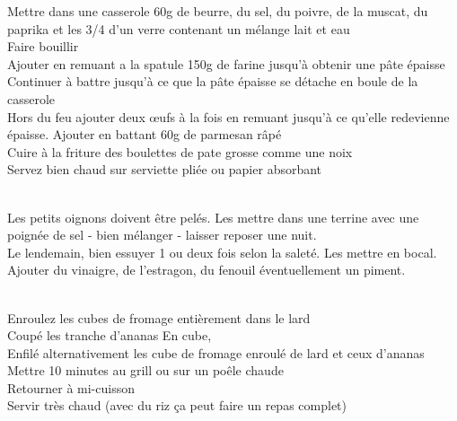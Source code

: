 \begin{minipage}[c]{\textwidth}
Mettre dans une casserole 60g de beurre, du sel, du poivre, de la muscat, du paprika et les 3/4 d'un verre contenant un mélange lait et eau\\
Faire bouillir\\
Ajouter en remuant a la spatule 150g de farine jusqu’à obtenir une pâte épaisse\\
Continuer à battre jusqu’à ce que la pâte épaisse se détache en boule de la casserole\\
Hors du feu ajouter deux œufs à la fois en remuant jusqu'à   ce qu'elle redevienne épaisse. Ajouter en battant 60g de parmesan râpé\\
Cuire à la friture des boulettes de pate grosse comme une noix\\
Servez bien chaud sur serviette pliée ou papier absorbant\\
\\

\end{minipage}

\begin{minipage}[c]{\textwidth}
Les petits oignons doivent être pelés. Les mettre dans une terrine avec une poignée de sel - bien mélanger - laisser reposer une nuit. \\
Le lendemain, bien essuyer 1 ou deux fois selon la saleté. Les mettre en bocal. Ajouter du vinaigre, de l'estragon, du fenouil  éventuellement un piment.\\
\\

\end{minipage}

\begin{minipage}[c]{\textwidth}
Enroulez les cubes de fromage entièrement dans le lard\\
Coupé les tranche d'ananas En cube,\\
Enfilé alternativement les cube de fromage enroulé de lard et ceux d'ananas\\
Mettre 10 minutes au grill ou sur un poêle chaude\\
Retourner à mi-cuisson\\
Servir très chaud (avec du riz ça peut faire un repas complet)\\
\\

\end{minipage}

